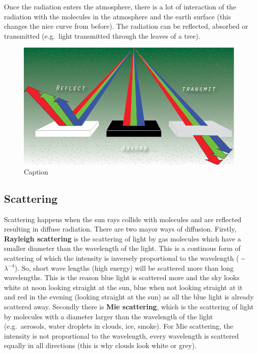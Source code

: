 \documentclass[oneside]{book}
\begin{document}
Once the radiation enters the atmosphere, there is a lot of interaction
of the radiation with the molecules in the atmosphere and the earth
surface (this changes the nice curve from before). The radiation can be
reflected, absorbed or transmitted (e.g.~light transmitted through the
leaves of a tree).

\begin{figure}

{\centering \includegraphics[width=0.5\linewidth]{figures/Figure123} 

}

\caption{Caption}\label{fig:Spectrum2}
\end{figure}

\subsection{Scattering}\label{scattering}

Scattering happens when the sun rays collide with molecules and are
reflected resulting in diffuse radiation. There are two mayor ways of
diffusion. Firstly, \textbf{Rayleigh scattering} is the scattering of
light by gas molecules which have a smaller diameter than the wavelength
of the light. This is a continous form of scattering of which the
intensity is inversely proportional to the wavelength (
\textasciitilde{} \(\lambda^{-4}\)). So, short wave lengths (high
energy) will be scattered more than long wavelengths. This is the reason
blue light is scattered more and the sky looks white at noon looking
straight at the sun, blue when not looking straight at it and red in the
evening (looking straight at the sun) as all the blue light is already
scattered away. Secondly there is \textbf{Mie scattering}, which is the
scattering of light by molecules with a diameter larger than the
wavelength of the light (e.g.~aerosols, water droplets in clouds, ice,
smoke). For Mie scattering, the intensity is not proportional to the
wavelength, every wavelength is scattered equally in all directions
(this is why clouds look white or grey).
\end{document}
